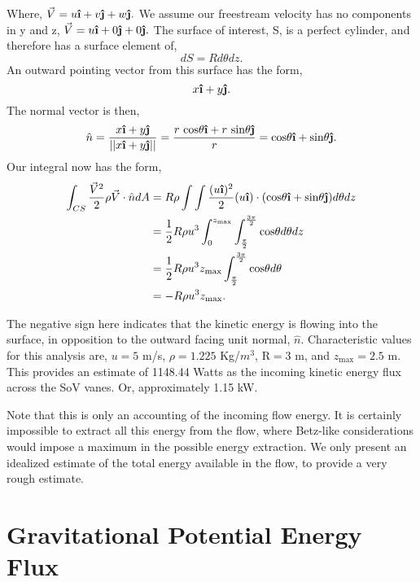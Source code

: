 \documentclass{article}
\newcommand{\uveci}{{\bm{\hat{\textnormal{\bfseries\i}}}}}
\newcommand{\uvecj}{{\bm{\hat{\textnormal{\bfseries\j}}}}}
\begin{document}
Where, $\vec V = u \uveci + v \uvecj + w \uvecj.$ 
We assume our freestream velocity has no components in y and z, 
$\vec V = u \uveci + 0 \uvecj + 0 \uvecj.$ The surface of interest, S,
is a perfect cylinder, and therefore has a surface element of, 
\begin{equation*}
dS = Rd\theta dz. 
\end{equation*}
An outward pointing vector from this surface has the form, 
\begin{equation*}
x \uveci + y \uvecj. 
\end{equation*}
The normal vector is then,
\begin{equation*}
\hat n = \frac{x \uveci + y \uvecj }{||x \uveci + y \uvecj||} =
 \frac{r\text{ cos}\theta \uveci + r\text{ sin}\theta \uvecj}{r} =
 \text{cos}\theta \uveci + \text{sin}\theta \uvecj. 
\end{equation*}
Our integral now has the form, 
\begin{align*}
\int_{CS} \frac{\vec V^2}{2} \rho \vec V \cdot \hat n dA & = R \rho \int
 \int \frac{(u \uveci)^2}{2} (u \uveci) \cdot
 (\text{cos}\theta \uveci + \text{sin}\theta \uvecj) d\theta dz \\
 & = \frac{1}{2} R \rho u^3 \int^{z_\text{max}}_0
 \int^{\frac{3\pi}{2}}_{\frac{\pi}{2}} \text{cos}\theta d\theta dz \\ 
 & = \frac{1}{2} R \rho u^3 z_\text{max}
 \int^{\frac{3\pi}{2}}_{\frac{\pi}{2}} \text{cos}\theta d\theta \\
 & = -R \rho u^3 z_\text{max}. 
\end{align*}

The negative sign here indicates that the kinetic energy is flowing into
the surface, in opposition to the outward facing unit normal, $\hat
n$. Characteristic values for this analysis are, $u = 5$ m/s, $\rho =
1.225$ Kg/$m^3$, R$= 3$ m, and $z_{\text{max}} = 2.5$ m. This provides
an estimate of 1148.44 Watts as the incoming kinetic energy flux across
the SoV vanes. Or, approximately 1.15 kW. 

Note that this is only an accounting of the incoming flow energy. It is certainly
impossible to extract all this energy from the flow, where Betz-like considerations 
would impose a maximum in the possible energy extraction. We only present an idealized
estimate of the total energy available in the flow, to provide a very rough estimate.


\section*{Gravitational Potential Energy Flux}
\end{document}
